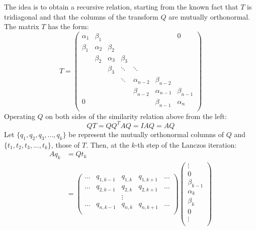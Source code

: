 The idea is to obtain a recursive relation, starting from the known fact that $T$ is tridiagonal and that the columns of the transform $Q$ are mutually orthonormal. The matrix $T$ has the form:
%
\begin{equation}
T = \begin{pmatrix}
    \alpha_1 & \beta_1    &                &               &                         &                      & 0              \\
    \beta_1  & \alpha_2  & \beta_2   &               &                         &                      &                  \\
                 & \beta_2    & \alpha_3  & \beta_3  &                        &                      &                   \\
                 &                &  \beta_3    &\ddots    & \ddots             &                      &                    \\
                 &                 &           &     \ddots     &  \alpha_{n-2}   &  \beta_{n-2} &                     \\
                 &                 &           &                     & \beta_{n-2}     & \alpha_{n-1} & \beta_{n-1}  \\
             0  &                 &           &                     &                         & \beta_{n-1}   & \alpha_n      \\
 
  \end{pmatrix}
\end{equation}
%
Operating $Q$ on both sides of the similarity relation above from the left: 
%
\begin{equation}
QT = QQ^{T}AQ = IAQ= AQ
\end{equation}
%
Let $\lbrace q_1, q_2, q_3, ... , q_k \rbrace $ be represent the mutually orthonormal columns of $Q$ and $\lbrace t_1,t_2,t_3,...,t_k \rbrace$, those of $T$.  Then, at the $k$-th step of the Lanczos iteration:
%
\begin{align}
A q_k &= Q t_k \\
&= \begin{pmatrix} 
\dots & q_{1,k-1} & q_{1,k} & q_{1,k+1} & \dots \\
\dots & q_{2,k-1} & q_{2,k} & q_{2,k+1} & \dots \\
& & \vdots & & \\
\dots & q_{n,k-1} & q_{n,k} & q_{n,k+1} & \dots \\
\end{pmatrix} 
\begin{pmatrix}
\vdots \\
0 \\
\beta_{k-1}\\
\alpha_{k}\\
\beta_{k}\\
0 \\
\vdots \\
\end{pmatrix}
\end{align}
